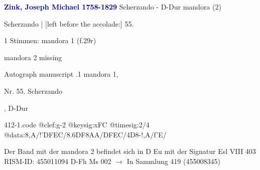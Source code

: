 \documentclass[twocolumn]{book}
\begin{document}
\newline \par \vspace{7pt} \textcolor{darkblue}{\textbf{Zink, Joseph Michael  1758-1829}}
\newline Scherzando - D-Dur
\newline mandora (2)
\newline \begin{itshape}[f.29r, at left:] Scherzando | [left before the accolade:] 55.\end{itshape} 
\newline \textcolor{darkblue}{}  1 Stimmen: mandora 1  (f.29r)
\newline \begin{small} mandora 2 missing\end{small} 
\newline Autograph manuscript
.1  mandora 1, \begin{itshape}Nr. 55. Scherzando\end{itshape}, D-Dur  
\begin{filecontents*}{412-1.code}
@clef:g-2
@keysig:xFC
@timesig:2/4
@data:8,A/!'DFEC/{8.6DF}8AA/DFEC/4D8-!,A/f'E/
\end{filecontents*}
\newline
%
\newline Der Band mit der mandora 2 befindet sich in D Eu mit der Signatur Esl VIII 403
\newline RISM-ID: 455011094
\newline D-Fh  Ms 002
\newline $\rightarrow$ In Sammlung 419 (455008345)
      
\end{document}
